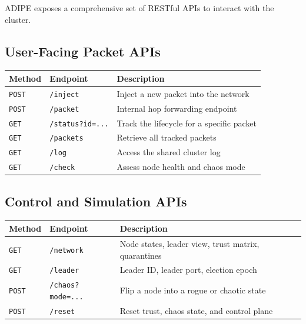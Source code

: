\documentclass[12pt]{article}
\begin{document}
ADIPE exposes a comprehensive set of RESTful APIs to interact with the cluster.

\subsection{User-Facing Packet APIs}
\begin{table}[h]
    \centering
    \begin{tabularx}{\textwidth}{l l X}
        \toprule
        \textbf{Method} & \textbf{Endpoint} & \textbf{Description} \\
        \midrule
        \texttt{POST} & \texttt{/inject} & Inject a new packet into the network \\
        \texttt{POST} & \texttt{/packet} & Internal hop forwarding endpoint \\
        \texttt{GET}  & \texttt{/status?id=...} & Track the lifecycle for a specific packet \\
        \texttt{GET}  & \texttt{/packets} & Retrieve all tracked packets \\
        \texttt{GET}  & \texttt{/log} & Access the shared cluster log \\
        \texttt{GET}  & \texttt{/check} & Assess node health and chaos mode \\
        \bottomrule
    \end{tabularx}
\end{table}

\subsection{Control and Simulation APIs}
\begin{table}[h]
    \centering
    \begin{tabularx}{\textwidth}{l l X}
        \toprule
        \textbf{Method} & \textbf{Endpoint} & \textbf{Description} \\
        \midrule
        \texttt{GET}  & \texttt{/network} & Node states, leader view, trust matrix, quarantines \\
        \texttt{GET}  & \texttt{/leader} & Leader ID, leader port, election epoch \\
        \texttt{POST} & \texttt{/chaos?mode=...} & Flip a node into a rogue or chaotic state \\
        \texttt{POST} & \texttt{/reset} & Reset trust, chaos state, and control plane \\
        \bottomrule
    \end{tabularx}
\end{table}
\end{document}
